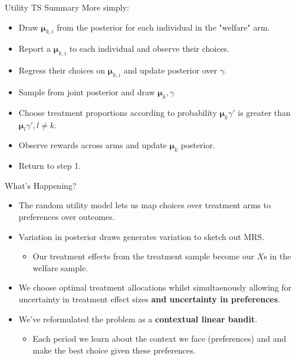 \documentclass[aspectratio=169,xcolor=dvipsnames]{beamer}
\begin{document}
\begin{frame}{Utility TS Summary}
    More simply:
    \begin{itemize}
        \item Draw $\bm{\mu}_{k, i}$ from the posterior for each individual in the "welfare" arm. 
        \item Report a $\bm{\mu}_{k, i}$ to each individual and observe their choices.
        \item Regress their choices on $\bm{\mu}_{k,i}$ and update posterior over $\gamma$.
        \item Sample from joint posterior and draw $\bm{\mu}_{k}, \gamma$
        \item Choose treatment proportions according to probability  $\bm{\mu}_k \gamma'$ is 
        greater than $\bm{\mu}_l \gamma', l \neq k$.
        \item Observe rewards across arms and update $\bm{\mu}_k$ posterior.
        \item Return to step 1.
         \end{itemize}

\end{frame}

\begin{frame}{What's Happening?}

\begin{itemize}
    \item The random utility model lets us map choices over treatment arms to preferences 
over outcomes.
    \item Variation in posterior draws generates variation to sketch out MRS.
    \begin{itemize}
        \item Our treatment effects from the treatment sample become our $X$s in the welfare sample.
    \end{itemize}
    \item We choose optimal treatment allocations whilst simultaenously allowing for 
    uncertainty in treatment effect sizes \textbf{and uncertainty in preferences}.
    \item We've reformulated the problem as a \textbf{contextual linear bandit}.
     \begin{itemize}
         \item Each period we learn about the context we face (preferences) and 
         and make the best choice given these preferences.
     \end{itemize}
\end{itemize}
    

\end{frame}
\end{document}
